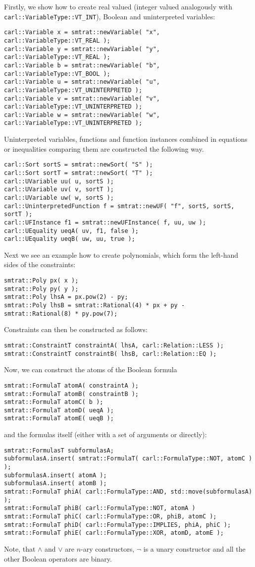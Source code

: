 Firstly, we show how to create real valued (integer valued analogously with \texttt{carl::VariableType::VT\_INT}), Boolean and uninterpreted variables:
\scriptsize
\begin{verbatim}
carl::Variable x = smtrat::newVariable( "x", carl::VariableType::VT_REAL );
carl::Variable y = smtrat::newVariable( "y", carl::VariableType::VT_REAL );
carl::Variable b = smtrat::newVariable( "b", carl::VariableType::VT_BOOL );
carl::Variable u = smtrat::newVariable( "u", carl::VariableType::VT_UNINTERPRETED );
carl::Variable v = smtrat::newVariable( "v", carl::VariableType::VT_UNINTERPRETED );
carl::Variable w = smtrat::newVariable( "w", carl::VariableType::VT_UNINTERPRETED );
\end{verbatim}
\normalsize
Uninterpreted variables, functions and function instances combined in equations or inequalities comparing them are constructed the following way.
\scriptsize
\begin{verbatim}
carl::Sort sortS = smtrat::newSort( "S" );
carl::Sort sortT = smtrat::newSort( "T" );
carl::UVariable uu( u, sortS );
carl::UVariable uv( v, sortT );
carl::UVariable uw( w, sortS );
carl::UninterpretedFunction f = smtrat::newUF( "f", sortS, sortS, sortT );
carl::UFInstance f1 = smtrat::newUFInstance( f, uu, uw );
carl::UEquality ueqA( uv, f1, false );
carl::UEquality ueqB( uw, uu, true );
\end{verbatim}
\normalsize
Next we see an example how to create polynomials, which form the left-hand sides of the constraints:
\scriptsize
\begin{verbatim}
smtrat::Poly px( x );
smtrat::Poly py( y );
smtrat::Poly lhsA = px.pow(2) - py;
smtrat::Poly lhsB = smtrat::Rational(4) * px + py - smtrat::Rational(8) * py.pow(7);
\end{verbatim}
\normalsize
Constraints can then be constructed as follows:
\scriptsize
\begin{verbatim}
smtrat::ConstraintT constraintA( lhsA, carl::Relation::LESS );
smtrat::ConstraintT constraintB( lhsB, carl::Relation::EQ );
\end{verbatim}
\normalsize
Now, we can construct the atoms of the Boolean formula
\scriptsize
\begin{verbatim}
smtrat::FormulaT atomA( constraintA );
smtrat::FormulaT atomB( constraintB );
smtrat::FormulaT atomC( b );
smtrat::FormulaT atomD( ueqA );
smtrat::FormulaT atomE( ueqB );
\end{verbatim}
\normalsize
and the formulas itself (either with a set of arguments or directly):
\scriptsize
\begin{verbatim}
smtrat::FormulasT subformulasA;
subformulasA.insert( smtrat::FormulaT( carl::FormulaType::NOT, atomC ) );
subformulasA.insert( atomA );
subformulasA.insert( atomB );
smtrat::FormulaT phiA( carl::FormulaType::AND, std::move(subformulasA) );
smtrat::FormulaT phiB( carl::FormulaType::NOT, atomA )
smtrat::FormulaT phiC( carl::FormulaType::OR, phiB, atomC );
smtrat::FormulaT phiD( carl::FormulaType::IMPLIES, phiA, phiC );
smtrat::FormulaT phiE( carl::FormulaType::XOR, atomD, atomE );
\end{verbatim}
\normalsize
Note, that $\land$ and $\lor$ are $n$-ary constructors, $\neg$ is a unary constructor and all the other Boolean operators are binary.

